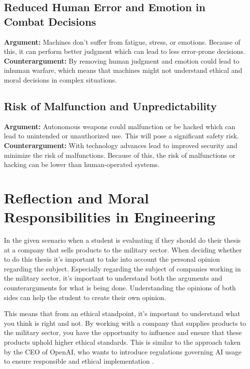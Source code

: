 \documentclass{article}
\begin{document}
\subsection{Reduced Human Error and Emotion in Combat Decisions}
\textbf{Argument:} Machines don't suffer from fatigue, stress, or emotions. Because of this, it can perform better judgment which can lead to less error-prone decisions. \\

\noindent \textbf{Counterargument:} By removing human judgment and emotion could lead to inhuman warfare, which means that machines might not understand ethical and moral decisions in complex situations.

\subsection{Risk of Malfunction and Unpredictability}
\textbf{Argument:} Autonomous weapons could malfunction or be hacked which can lead to unintended or unauthorized use. This will pose a significant safety risk. \\

\noindent \textbf{Counterargument:} With technology advances lead to improved security and minimize the risk of malfunctions. Because of this, the risk of malfunctions or hacking can be lower than human-operated systems.

\section{Reflection and Moral Responsibilities in Engineering}
In the given scenario when a student is evaluating if they should do their thesis at a company that sells products to the military sector. When deciding whether to do this thesis it's important to take into account the personal opinion regarding the subject. Especially regarding the subject of companies working in the military sector, it's important to understand both the arguments and counterarguments for what is being done. Understanding the opinions of both sides can help the student to create their own opinion.

This means that from an ethical standpoint, it's important to understand what you think is right and not.  By working with a company that supplies products to the military sector, you have the opportunity to influence and ensure that these products uphold higher ethical standards. This is similar to the approach taken by the CEO of OpenAI, who wants to introduce regulations governing AI usage to ensure responsible and ethical implementation \cite{OpenAICE39:online}. 

\hspace{0cm}
\newpage



\end{document}
